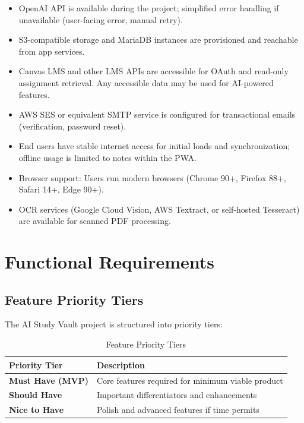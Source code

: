 \documentclass[12pt,a4paper]{article}
\begin{document}
\begin{itemize}
    \item OpenAI API is available during the project; simplified error handling if unavailable (user-facing error, manual retry).
    \item S3-compatible storage and MariaDB instances are provisioned and reachable from app services.
    \item Canvas LMS and other LMS APIs are accessible for OAuth and read-only assignment retrieval. Any accessible data may be used for AI-powered features.
    \item AWS SES or equivalent SMTP service is configured for transactional emails (verification, password reset).
    \item End users have stable internet access for initial loads and synchronization; offline usage is limited to notes within the PWA.
    \item Browser support: Users run modern browsers (Chrome 90+, Firefox 88+, Safari 14+, Edge 90+).
    \item OCR services (Google Cloud Vision, AWS Textract, or self-hosted Tesseract) are available for scanned PDF processing.
\end{itemize}

\section{Functional Requirements}

\subsection{Feature Priority Tiers}

The AI Study Vault project is structured into priority tiers:

\begin{table}[h]
\centering
\begin{tabular}{@{}ll@{}}
\toprule
\textbf{Priority Tier} & \textbf{Description} \\
\midrule
\textbf{Must Have (MVP)} & Core features required for minimum viable product \\
\textbf{Should Have} & Important differentiators and enhancements \\
\textbf{Nice to Have} & Polish and advanced features if time permits \\
\bottomrule
\end{tabular}
\caption{Feature Priority Tiers}
\end{table}
\end{document}
